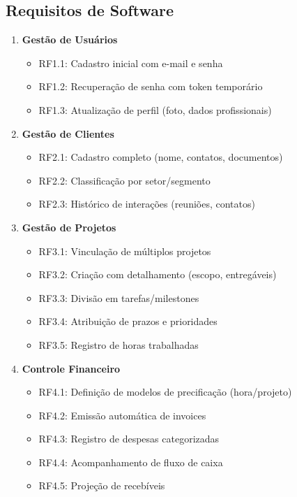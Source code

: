 \documentclass[a4paper,12pt]{article}
\begin{document}
\subsection{Requisitos de Software}

\begin{enumerate}[label=\textbf{RF\arabic*}, leftmargin=2.5cm]
  \item \textbf{Gestão de Usuários}
    \begin{itemize}[nosep]
      \item RF1.1: Cadastro inicial com e-mail e senha
      \item RF1.2: Recuperação de senha com token temporário
      \item RF1.3: Atualização de perfil (foto, dados profissionais)
    \end{itemize}
  
  \item \textbf{Gestão de Clientes}
    \begin{itemize}[nosep]
      \item RF2.1: Cadastro completo (nome, contatos, documentos)
      \item RF2.2: Classificação por setor/segmento
      \item RF2.3: Histórico de interações (reuniões, contatos)
    \end{itemize}
  
  \item \textbf{Gestão de Projetos}
    \begin{itemize}[nosep]
      \item RF3.1: Vinculação de múltiplos projetos
      \item RF3.2: Criação com detalhamento (escopo, entregáveis)
      \item RF3.3: Divisão em tarefas/milestones
      \item RF3.4: Atribuição de prazos e prioridades
      \item RF3.5: Registro de horas trabalhadas
    \end{itemize}
  
  \item \textbf{Controle Financeiro}
    \begin{itemize}[nosep]
      \item RF4.1: Definição de modelos de precificação (hora/projeto)
      \item RF4.2: Emissão automática de invoices
      \item RF4.3: Registro de despesas categorizadas
      \item RF4.4: Acompanhamento de fluxo de caixa
      \item RF4.5: Projeção de recebíveis
    \end{itemize}
  

\end{enumerate}
\end{document}
